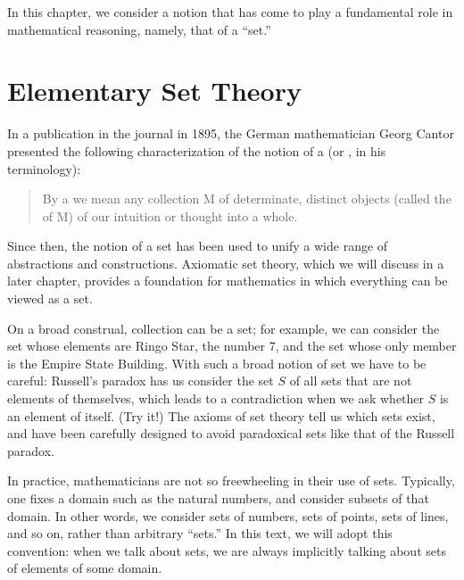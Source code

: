 \documentclass[letterpaper,10pt,english]{sphinxmanual}
\begin{document}
\sphinxAtStartPar
In this chapter, we consider a notion that has come to play a fundamental role in mathematical reasoning, namely, that of a “set.”


\section{Elementary Set Theory}
\label{\detokenize{sets:elementary-set-theory}}\label{\detokenize{sets:id2}}
\sphinxAtStartPar
In a publication in the journal  in 1895, the German mathematician Georg Cantor presented the following
characterization of the notion of a  (or , in his terminology):
\begin{quote}

\sphinxAtStartPar
By a  we mean any collection M of determinate, distinct objects (called the  of M) of our intuition or thought into a whole.
\end{quote}

\sphinxAtStartPar
Since then, the notion of a set has been used to unify a wide range of abstractions and constructions. Axiomatic set theory, which we will discuss in a later chapter, provides a foundation for mathematics in which everything can be viewed as a set.

\sphinxAtStartPar
On a broad construal,  collection can be a set; for example, we can consider the set whose elements are Ringo Star, the number 7, and the set whose only member is the Empire State Building. With such a broad notion of set we have to be careful: Russell’s paradox has us consider the set \(S\) of all sets that are not elements of themselves, which leads to a contradiction when we ask whether \(S\) is an element of itself. (Try it!) The axioms of set theory tell us which sets exist, and have been carefully designed to avoid paradoxical sets like that of the Russell paradox.

\sphinxAtStartPar
In practice, mathematicians are not so freewheeling in their use of sets. Typically, one fixes a domain such as the natural numbers, and consider subsets of that domain. In other words, we consider sets of numbers, sets of points, sets of lines, and so on, rather than arbitrary “sets.” In this text, we will adopt this convention: when we talk about sets, we are always implicitly talking about sets of elements of some domain.
\end{document}
